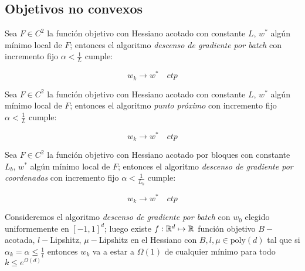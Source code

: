\subsection{Objetivos no convexos}

\begin{theorem}
	Sea $F \in C^2$ la funci\'on objetivo con Hessiano acotado con constante $L$, $w^*$ alg\'un m\'inimo local de $F$; entonces el algoritmo \textit{descenso de gradiente por batch} con incremento fijo $\alpha < \frac{1}{L}$ cumple:
	
	\begin{equation*}
		w_k \rightarrow w^* \quad ctp
	\end{equation*}
	
\end{theorem}

\begin{theorem}
	Sea $F \in C^2$ la funci\'on objetivo con Hessiano acotado con constante $L$, $w^*$ alg\'un m\'inimo local de $F$; entonces el algoritmo \textit{punto pr\'oximo } con incremento fijo $\alpha < \frac{1}{L}$ cumple:
	
	\begin{equation*}
	w_k \rightarrow w^* \quad ctp
	\end{equation*}
	
\end{theorem}

\begin{theorem}
	Sea $F \in C^2$ la funci\'on objetivo con Hessiano acotado por bloques con constante $L_b$, $w^*$ alg\'un m\'inimo local de $F$; entonces el algoritmo \textit{descenso de gradiente por coordenadas} con incremento fijo $\alpha < \frac{1}{L_b}$ cumple:
	
	\begin{equation*}
	w_k \rightarrow w^* \quad ctp
	\end{equation*}
	
\end{theorem}

\begin{theorem}
	Consideremos el algoritmo \textit{descenso de gradiente por batch} con $w_0$ elegido uniformemente en $[-1,1]^d$; luego existe $f : {\mathbb{R}}^d \mapsto {\mathbb{R}}$ funci\'on objetivo $B-$acotada, $l-$Lipshitz, $\mu-$Lipshitz en el Hessiano con $B,l,\mu \in \text{poly}(d)$ tal que si $\alpha_k = \alpha \leq \frac{1}{l}$ entonces $w_k$ va a estar a $\Omega(1)$ de cualquier m\'inimo para todo $k \leq e^{\Omega(d)}$
\end{theorem}

